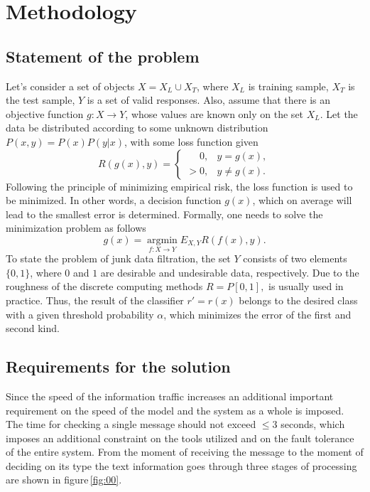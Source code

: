 \documentclass[12pt]{jpconf}
\begin{document}
\section{Methodology}
\subsection{Statement of the problem}
Let's consider a set of objects $ X = X_L \cup X_T$, where
$X_L$ is training sample,
$X_T$ is the test sample,
$Y$ is a set of valid responses. Also, assume that there is an objective function $g: X \rightarrow Y$, whose values are known only on the set $X_L$. Let the data be distributed according to some unknown distribution $P (x,y) = P(x) P (y|x)$, with some loss function given
$$
R(g(x), y) = 
\begin{cases} 
	\phantom{>}0, & y = g(x), \\
	> 0, & y \neq g(x).
\end{cases}
$$
Following the principle of minimizing empirical risk, the loss function is used to be minimized. In other words, a decision function $g(x)$, which on average will lead to the smallest error is determined. Formally, one needs to solve the minimization problem as follows
$$
g(x) = \operatorname*{argmin}_{f: X \rightarrow Y} E_{X,Y} R(f(x), y).
$$
To state the problem of junk data filtration, the set $Y$ consists of two elements $\{0, 1\}$, where $0$ and $1$ are desirable and undesirable data, respectively. Due to the roughness of the discrete computing methods $R = P[0, 1], $ is usually used in practice. Thus, the result of the classifier $r' = r(x)$ belongs to the desired class with a given threshold probability $\alpha$, which minimizes the error of the first and second kind.

\subsection{Requirements for the solution}
Since the speed of the information traffic increases an additional important requirement on the speed of the model and the system as a whole is imposed. The time for checking a single message should not exceed $\leqslant3$ seconds, which imposes an additional constraint on the tools utilized and on the fault tolerance of the entire system.
From the moment of receiving the message to the moment of deciding on its type the text information goes through three stages of processing are shown in figure\,\ref{fig:00}.
\end{document}
